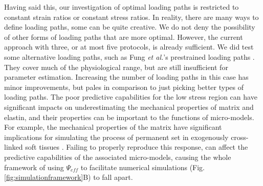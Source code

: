    
    Having said this, our investigation of optimal loading paths is restricted to constant strain ratios or constant stress ratios. In reality, there are many ways to define loading paths, some can be quite creative. We do not deny the possibility of other forms of loading paths that are more optimal. However, the current approach with three, or at most five protocols, is already sufficient. We did test some alternative loading paths, such as Fung \textit{et al.}'s prestrained loading paths \cite{fung_pseudoelasticity_1979}. They cover much of the physiological range, but are still insufficient for parameter estimation. Increasing the number of loading paths in this case has minor improvements, but pales in comparison to just picking better types of loading paths. The poor predictive capabilities for the low stress region can have significant impacts on underestimating the mechanical properties of matrix and elastin, and their properties can be important to the functions of micro-models. For example, the mechanical properties of the matrix have significant implications for simulating the process of permanent set in exogenously cross-linked soft tissues \cite{zhang_modeling_2017}. Failing to properly reproduce this response, can affect the predictive capabilities of the associated micro-models, causing the whole framework of using $\Psi_{eff}$ to facilitate numerical simulations (Fig. \ref{fig:simulationframework}B) to fall apart. 
    
    








